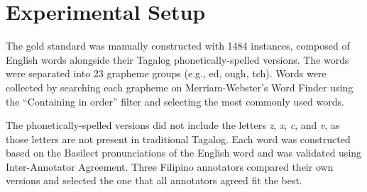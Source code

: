 \section{Experimental Setup}

The gold standard was manually constructed with 1484 instances, composed of
English words alongside their Tagalog phonetically-spelled versions. The words
were separated into 23 grapheme groups (e.g., ed, ough, tch). Words were collected
by searching each grapheme on Merriam-Webster's Word Finder using the
``Containing in order'' filter and selecting the most commonly used words.

The phonetically-spelled versions did not include the letters \emph{z}, \emph{x}, 
\emph{c}, and \emph{v}, as those letters are not present in traditional Tagalog.
Each word was constructed based on the Basilect pronunciations of the English word
and was validated using Inter-Annotator Agreement. Three Filipino annotators compared
their own versions and selected the one that all annotators agreed fit the best.